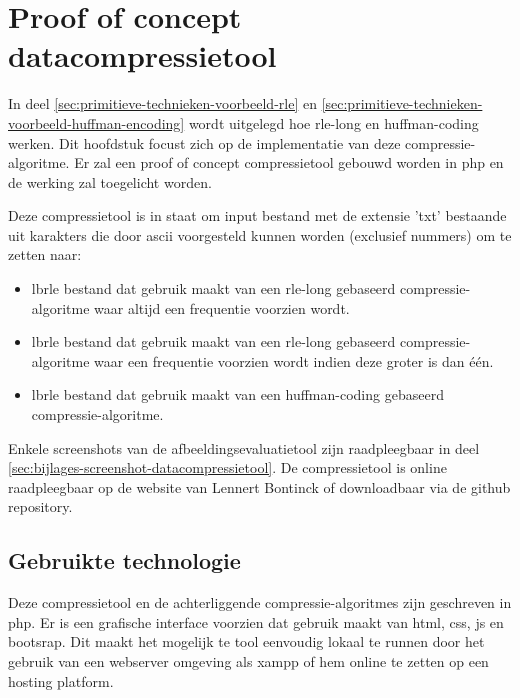 \chapter{Proof of concept datacompressietool}
\label{ch:compressietool}

In deel \ref{sec:primitieve-technieken-voorbeeld-rle} en \ref{sec:primitieve-technieken-voorbeeld-huffman-encoding} wordt uitgelegd hoe \gls{rle-long} en \gls{huffman-coding} werken. Dit hoofdstuk focust zich op de implementatie van deze \gls{compressie-algoritme}. Er zal een proof of concept \gls{compressietool} gebouwd worden in \gls{php} en de werking zal toegelicht worden. 

Deze \gls{compressietool} is in staat om input bestand met de \gls{extensie} 'txt' bestaande uit karakters die door \gls{ascii} voorgesteld kunnen worden (exclusief nummers) om te zetten naar:

\begin{itemize}
	\item \Gls{lbrle} bestand dat gebruik maakt van een \gls{rle-long} gebaseerd \gls{compressie-algoritme} waar altijd een frequentie voorzien wordt.
	
	\item \Gls{lbrle} bestand dat gebruik maakt van een \gls{rle-long} gebaseerd \gls{compressie-algoritme} waar een frequentie voorzien wordt indien deze groter is dan één.
	
	\item \Gls{lbrle} bestand dat gebruik maakt van een \gls{huffman-coding} gebaseerd \gls{compressie-algoritme}.
\end{itemize}

Enkele screenshots van de \gls{afbeeldingsevaluatietool} zijn raadpleegbaar in deel \ref{sec:bijlages-screenshot-datacompressietool}. De \gls{compressietool} is online raadpleegbaar op de website van Lennert Bontinck of downloadbaar via de \gls{github} repository.
 
\section{Gebruikte technologie}
\label{sec:compressietool-gebruikte-technologie}

Deze \gls{compressietool} en de achterliggende \glspl{compressie-algoritme} zijn geschreven in \gls{php}. Er is een grafische interface voorzien dat gebruik maakt van \gls{html}, \gls{css}, \gls{js} en \gls{bootsrap}. Dit maakt het mogelijk te tool eenvoudig lokaal te runnen door het gebruik van een webserver omgeving als \gls{xampp} of hem online te zetten op een \gls{hosting} platform.

